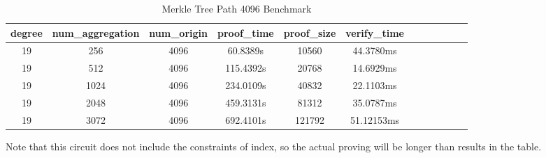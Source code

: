 \documentclass{article}
\begin{document}
\begin{table}[h!]
\centering
\begin{tabular}{|c|c|c|c|c|c|c|c|c|c|c|c|}
\hline
\textbf{degree}    & \textbf{num\_aggregation} & \textbf{num\_origin} & \textbf{proof\_time} & \textbf{proof\_size} & \textbf{verify\_time} \\ \hline
19   & 256 & 4096 & 60.8389s&10560&44.3780ms \\ \hline
19   & 512 & 4096 & 115.4392s&20768&14.6929ms \\ \hline
19   & 1024 & 4096 & 234.0109s&40832&22.1103ms \\ \hline
19   & 2048 & 4096 & 459.3131s&81312&35.0787ms \\ \hline
19   & 3072 & 4096 & 692.4101s&121792&51.12153ms \\ \hline
\end{tabular}
\caption{Merkle Tree Path 4096 Benchmark}
\label{tab:data_table}
\end{table}



Note that this circuit does not include the constraints of index, so the actual proving will be longer than results in the table.
\end{document}
